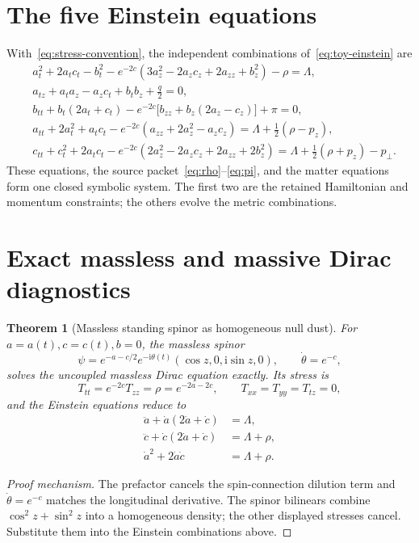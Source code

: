 \documentclass[11pt,a4paper,oneside]{book}
\theoremstyle{plain}
\newtheorem{theorem}{Theorem}[chapter]
\theoremstyle{definition}
\theoremstyle{remark}
\newcommand{\ii}{\mathrm i}
\newcommand{\src}[2]{\cite{#1}}
\begin{document}
\section{The five Einstein equations}
With~\eqref{eq:stress-convention}, the independent combinations of~\eqref{eq:toy-einstein} are
\begin{align}
 &a_t^2+2a_tc_t-b_t^2
 -e^{-2c}(3a_z^2-2a_zc_z+2a_{zz}+b_z^2)-\rho=\Lambda,
 \label{eq:einstein-constraint-plane}\\
 &a_{tz}+a_ta_z-a_zc_t+b_tb_z+\frac q2=0,
 \label{eq:einstein-momentum-plane}\\
 &b_{tt}+b_t(2a_t+c_t)
 -e^{-2c}\bigl[b_{zz}+b_z(2a_z-c_z)\bigr]+\pi=0,
 \label{eq:einstein-polarization-plane}\\
 &a_{tt}+2a_t^2+a_tc_t
 -e^{-2c}(a_{zz}+2a_z^2-a_zc_z)
 =\Lambda+\frac12(\rho-p_z),
 \label{eq:einstein-a-plane}\\
 &c_{tt}+c_t^2+2a_tc_t
 -e^{-2c}(2a_z^2-2a_zc_z+2a_{zz}+2b_z^2)
 =\Lambda+\frac12(\rho+p_z)-p_\perp.
 \label{eq:einstein-c-plane}
\end{align}
These equations, the source packet~\eqref{eq:rho}--\eqref{eq:pi}, and the matter equations form one closed symbolic system. The first two are the retained Hamiltonian and momentum constraints; the others evolve the metric combinations. \src{R20}{thm:v20v24-einstein}

\section{Exact massless and massive Dirac diagnostics}
\begin{theorem}[Massless standing spinor as homogeneous null dust]
\label{thm:dirac-null}
For $a=a(t),c=c(t),b=0$, the massless spinor
\begin{equation}
 \psi=e^{-a-c/2}e^{-\ii\theta(t)}(\cos z,0,\ii\sin z,0),
 \qquad\dot\theta=e^{-c},
 \label{eq:dirac-null}
\end{equation}
solves the uncoupled massless Dirac equation exactly. Its stress is
\begin{equation}
 T_{tt}=e^{-2c}T_{zz}=\rho=e^{-2a-2c},\qquad
 T_{xx}=T_{yy}=T_{tz}=0,
\end{equation}
and the Einstein equations reduce to
\begin{equation}
\begin{aligned}
 \ddot a+\dot a(2\dot a+\dot c)&=\Lambda,\\
 \ddot c+\dot c(2\dot a+\dot c)&=\Lambda+\rho,\\
 \dot a^2+2\dot a\dot c&=\Lambda+\rho.
\end{aligned}
 \label{eq:dirac-bianchi}
\end{equation}
\end{theorem}
\begin{proof}[Proof mechanism]
The prefactor cancels the spin-connection dilution term and $\dot\theta=e^{-c}$ matches the longitudinal derivative. The spinor bilinears combine $\cos^2z+\sin^2z$ into a homogeneous density; the other displayed stresses cancel. Substitute them into the Einstein combinations above.
\end{proof}
\src{R20}{thm:v20v16-nulldust}
\end{document}
